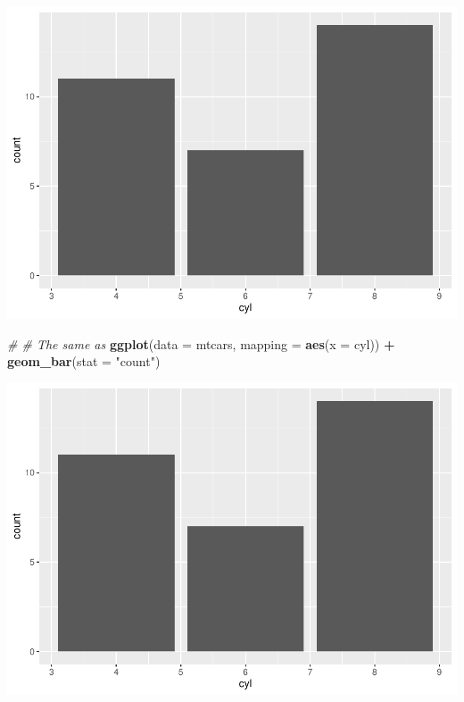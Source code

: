 \documentclass[
]{article}
\newenvironment{Shaded}{\begin{snugshade}}{\end{snugshade}}
\newcommand{\AttributeTok}[1]{\textcolor[rgb]{0.13,0.29,0.53}{#1}}
\newcommand{\CommentTok}[1]{\textcolor[rgb]{0.56,0.35,0.01}{\textit{#1}}}
\newcommand{\FunctionTok}[1]{\textcolor[rgb]{0.13,0.29,0.53}{\textbf{#1}}}
\newcommand{\NormalTok}[1]{#1}
\newcommand{\SpecialCharTok}[1]{\textcolor[rgb]{0.81,0.36,0.00}{\textbf{#1}}}
\newcommand{\StringTok}[1]{\textcolor[rgb]{0.31,0.60,0.02}{#1}}
\begin{document}
\begin{center}\includegraphics{P1_exercises_files/figure-latex/barplot-ggplot2-1} \end{center}

\begin{Shaded}
\begin{Highlighting}[]
\CommentTok{\# \# The same as}
 \FunctionTok{ggplot}\NormalTok{(}\AttributeTok{data =}\NormalTok{ mtcars, }\AttributeTok{mapping =} \FunctionTok{aes}\NormalTok{(}\AttributeTok{x =}\NormalTok{ cyl)) }\SpecialCharTok{+}
   \FunctionTok{geom\_bar}\NormalTok{(}\AttributeTok{stat =} \StringTok{"count"}\NormalTok{)}
\end{Highlighting}
\end{Shaded}

\begin{center}\includegraphics{P1_exercises_files/figure-latex/barplot-ggplot2-2} \end{center}
\end{document}
